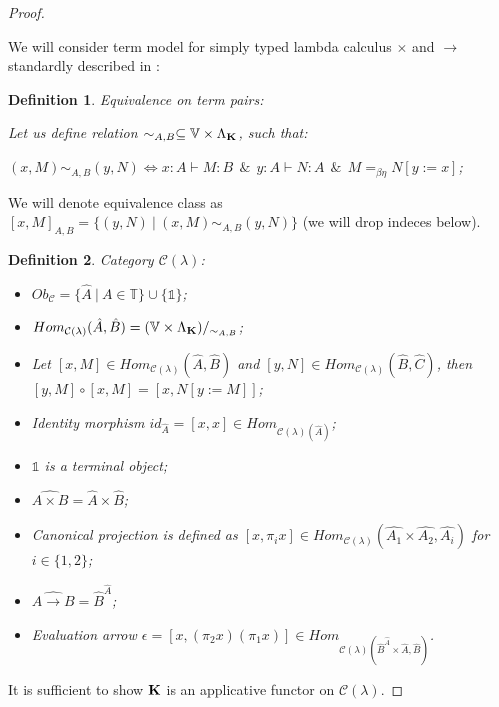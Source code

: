 \documentclass[a4paper]{article}
\newtheorem{defin}{Definition}
\begin{document}
\begin{proof}

$ $

We will consider term model for simply typed lambda calculus $\times$ and $\to$ standardly described in \cite{LambekScott}:

\begin{defin} Equivalence on term pairs:
  $ $

  Let us define relation $\sim_{A, B} \subseteq \mathbb{V} \times \Lambda_{{\bf K}}$, such that:

  $(x, M) \sim_{A, B} (y, N) \Leftrightarrow x : A \vdash M : B \:\: \& \:\: y : A \vdash N : A \:\: \& \:\: M =_{\beta \eta} N [y := x]$;
\end{defin}

We will denote equivalence class as $[x, M]_{A, B} = \{ (y, N) \: | \: (x, M) \sim_{A, B} (y, N) \}$ (we will drop indeces below).


\begin{defin} Category $\mathcal{C}(\lambda)$:
\begin{itemize}
  \item $Ob_{\mathcal{C}} = \{ \hat{A} \: | \: A \in \mathbb{T} \} \cup \{ \mathds{1} \}$;
  \item $Hom_{\mathcal{C}(\lambda)}(\hat{A},\hat{B}) = (\mathbb{V} \times \Lambda_{{\bf K}})/_{\sim_{A, B}}$;
  \item Let $[x, M] \in Hom_{\mathcal{C}(\lambda)}(\hat{A},\hat{B})$ and $[y,N] \in Hom_{\mathcal{C}(\lambda)}(\hat{B},\hat{C})$, then $[y,M] \circ [x, M] = [x, N [y := M]]$;
  \item Identity morphism $id_{\hat{A}} = [x,x] \in Hom_{\mathcal{C}(\lambda)(\hat{A})}$;
  \item $\mathds{1}$ is a terminal object;
  \item $\widehat{A \times B} = \hat{A} \times \hat{B}$;
  \item Canonical projection is defined as $[x, \pi_i x] \in Hom_{\mathcal{C}(\lambda)}(\hat{A_1} \times \hat{A_2},\hat{A_i})$ for $i \in \{ 1, 2 \}$;
  \item $\widehat{A \to B} = \hat{B}^{\hat{A}}$;
  \item Evaluation arrow $\epsilon = [x, (\pi_2 x) (\pi_1 x)] \in Hom_{\mathcal{C}(\lambda)(\hat{B}^{\hat{A}} \times \hat{A}, \hat{B})}$.
\end{itemize}
\end{defin}

It is sufficient to show ${\bf K}$ is an applicative functor on $\mathcal{C}(\lambda)$.


\end{proof}
\end{document}
